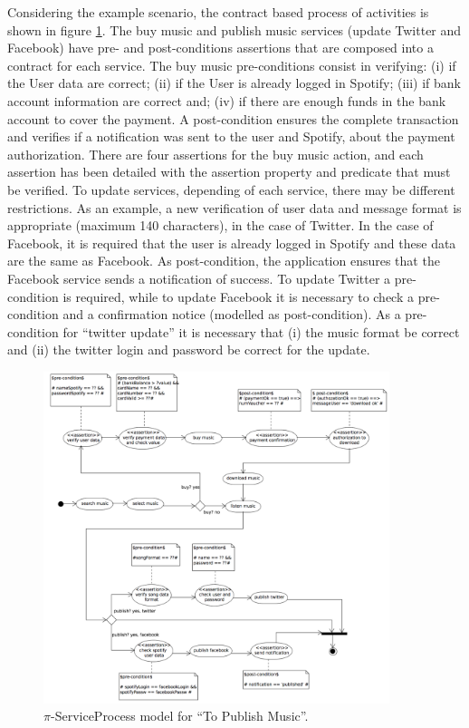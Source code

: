 \begin{example}\label{ex:toPublicMusic3}
Considering the example scenario, the contract based process of activities  is shown in figure \ref{fig:CIM:serviceprocess}. The buy music and publish music services (update Twitter and Facebook) have pre- and post-conditions assertions that are composed into a contract for each service. The buy music pre-conditions consist in verifying: 
(i) if the User data are correct; 
(ii) if the User is already logged in Spotify; 
(iii) if bank account information are correct and; 
(iv) if there are enough funds in the bank account to cover the payment. 
A post-condition ensures the complete transaction and verifies if a notification was sent to the user and Spotify, about the payment authorization. There are four assertions for the buy music action, and each assertion has been detailed with the assertion property and predicate that must be verified. To update services, depending of each service, there may be different restrictions. As an example, a new verification of user data and message format is appropriate (maximum 140 characters), in the case of Twitter. In the case of Facebook, it is required that the user is already logged in Spotify and these data are the same as Facebook. 
As post-condition, the application ensures that the Facebook service sends a notification of success. 
To update Twitter a pre-condition is required, while to update Facebook it is necessary to check a pre-condition and a confirmation notice (modelled as post-condition). 
As a pre-condition for ``twitter update'' it is necessary that (i) the music format be correct and (ii) the twitter login and password be correct for the update.
\end{example}

\begin{figure}[htpb]
\center
\includegraphics[width=0.9\textwidth]{figs/ServiceProcess.pdf}
\caption{\label{fig:CIM:serviceprocess} $\pi$-ServiceProcess model for ``To Publish Music''.}
\end{figure}

